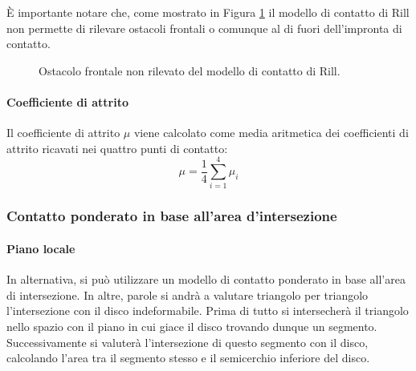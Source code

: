 È importante notare che, come mostrato in Figura \ref{rillimpediment} il modello di contatto di Rill non permette di rilevare ostacoli frontali o comunque al di fuori dell'impronta di contatto.
\begin{figure}[h!]
	\centering
	\caption{Ostacolo frontale non rilevato del modello di contatto di Rill.}
	\label{rillimpediment}
\end{figure}

\paragraph{Coefficiente di attrito}
Il coefficiente di attrito $\mu$ viene calcolato come media aritmetica dei coefficienti di attrito ricavati nei quattro punti di contatto:
%
\begin{equation}
\mu = \frac{1}{4}\sum_{i=1}^{4}\mu_i
\end{equation}
%
\subsubsection{Contatto ponderato in base all'area d'intersezione}
%
\paragraph{Piano locale}
In alternativa, si può utilizzare un modello di contatto ponderato in base all'area di intersezione. In altre, parole si andrà a valutare triangolo per triangolo l'intersezione con il disco indeformabile. Prima di tutto si intersecherà il triangolo nello spazio con il piano in cui giace il disco trovando dunque un segmento. Successivamente si valuterà l'intersezione di questo segmento con il disco, calcolando l'area tra il segmento stesso e il semicerchio inferiore del disco.

